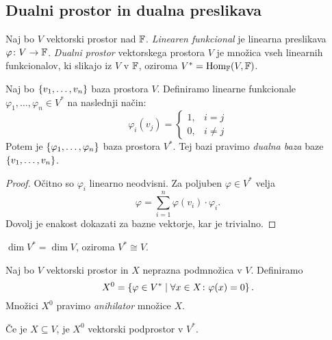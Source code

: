 \documentclass[12pt, a4paper]{article}
\begin{document}
\newpage

\subsection{Dualni prostor in dualna preslikava}

\begin{okvir}
\begin{definicija}
Naj bo $V$ vektorski prostor nad $\mathbb{F}$. \emph{Linearen funkcional} je linearna preslikava $\varphi\colon V\to\mathbb{F}$. \emph{Dualni prostor} vektorskega prostora $V$ je množica vseh linearnih funkcionalov, ki slikajo iz $V$ v $\mathbb{F}$, oziroma $V^*=\operatorname{Hom}_{\mathbb{F}}(V,\mathbb{F})$.
\end{definicija}
\end{okvir}

\begin{izrek}
Naj bo $\left\{v_1,\dots,v_n\right\}$ baza prostora $V$. Definiramo linearne funkcionale $\varphi_1,\dots,\varphi_n\in V^*$ na naslednji način:
\[
\varphi_i(v_j)=
\begin{cases}
1, &i=j
\\
0, &i\ne j
\end{cases}
\]
Potem je $\left\{\varphi_1,\dots,\varphi_n\right\}$ baza prostora $V^*$. Tej bazi pravimo \emph{dualna baza} baze $\left\{v_1,\dots,v_n\right\}$.
\end{izrek}

\begin{proof}
Očitno so $\varphi_i$ linearno neodvisni. Za poljuben $\varphi\in V^*$ velja
\[
\varphi=\sum_{i=1}^n \varphi(v_i)\cdot\varphi_i.
\]
Dovolj je enakost dokazati za bazne vektorje, kar je trivialno.
\end{proof}

\begin{posledica}
$\dim V^*=\dim V$, oziroma $V^*\cong V$.
\end{posledica}

\begin{definicija}
Naj bo $V$ vektorski prostor in $X$ neprazna podmnožica v $V$. Definiramo
\[
X^0=\left\{\varphi\in V^*\mid \forall x\in X\colon\varphi(x)=0\right\}.
\]
Množici $X^0$ pravimo \emph{anihilator} množice $X$.
\end{definicija}

\begin{trditev}
Če je $X\subseteq V$, je $X^0$ vektorski podprostor v $V^*$.
\end{trditev}
\end{document}
